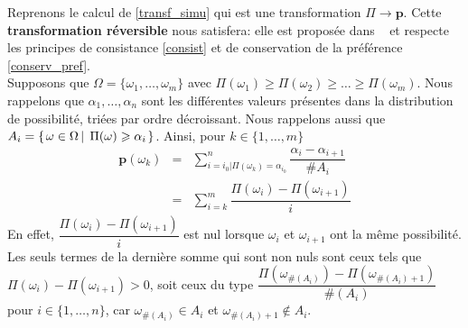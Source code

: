 {Reprenons le calcul de \ref{transf_simu} qui est une transformation $\Pi \rightarrow \mathbf{p}$. Cette \textbf{transformation réversible} nous satisfera: elle est proposée dans ~\cite{ DuPr1983.2} et respecte les principes de consistance  \ref{consist} et de conservation de la préférence \ref{conserv_pref}.\\
Supposons que $\Omega = \{ \omega_1,\ldots,\omega_m \}$ avec $\Pi(\omega_1) \geqslant \Pi(\omega_2) \geqslant \ldots \geqslant \Pi(\omega_m)$. Nous rappelons que $\alpha_1,\ldots,\alpha_n$ sont les différentes valeurs présentes dans la distribution de possibilité, triées par ordre décroissant. Nous rappelons aussi que $A_i=\left\{ \left. \omega \in \Omega \, \right| \left. \, \Pi(\omega) \geqslant \alpha_i  \right. \right\}$. Ainsi, pour $k \in \{1,\ldots,m\}$
\begin{eqnarray*}
\mathbf{p}(\omega_k) & = & \sum_{i=i_0 \vert \Pi(\omega_k)=\alpha_{i_0} }^n  \dfrac{\alpha_i-\alpha_{i+1}}{ \# A_i } \\
& = & \sum_{i=k}^m \dfrac{\Pi(\omega_i) - \Pi(\omega_{i+1})}{i}
\end{eqnarray*}
En effet, $\dfrac{\Pi(\omega_i) - \Pi(\omega_{i+1})}{i}$ est nul lorsque $\omega_i$ et $\omega_{i+1}$ ont la même possibilité. Les seuls termes de la dernière somme qui sont non nuls sont ceux tels que $\Pi(\omega_i)-\Pi(\omega_{i+1})>0$, soit ceux du type $\dfrac{\Pi(\omega_{\#(A_i)})-\Pi(\omega_{\#(A_i)+1})}{\#(A_i)}$ pour $i \in \{1,\ldots,n \}$,  car $\omega_{\#(A_i)} \in A_i$ et $\omega_{\#(A_i)+1} \notin A_i$.
\\

}
